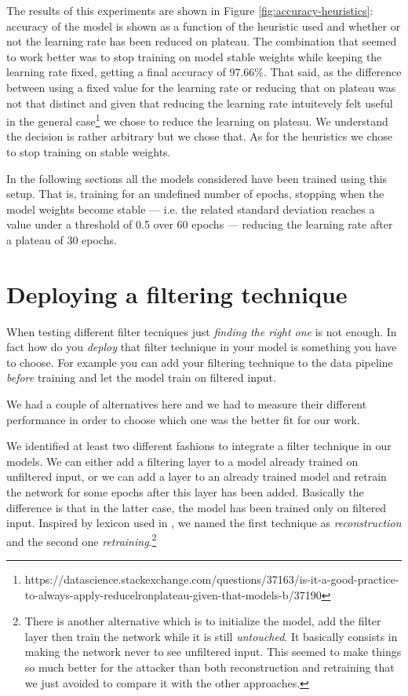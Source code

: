 The results of this experiments are shown in Figure
\ref{fig:accuracy-heuristics}: accuracy of the model is shown as a
function of the heuristic used and whether or not the learning rate has
been reduced on plateau. The combination that seemed to work better was
to stop training on model stable weights while keeping the learning
rate fixed, getting a final accuracy of 97.66\%. That said, as the
difference between using a fixed value for the learning rate or
reducing that on plateau was not that distinct and given that reducing
the learning rate intuitevely felt useful in the general
case\footnote{https://datascience.stackexchange.com/questions/37163/is-it-a-good-practice-to-always-apply-reducelronplateau-given-that-models-b/37190}
we chose to reduce the learning on plateau. We understand the decision
is rather arbitrary but we chose that. As for the heuristics we chose
to stop training on stable weights.

In the following sections all the models considered have been trained
using this setup. That is, training for an undefined number of
epochs, stopping when the model weights become stable --- i.e. the
related standard deviation reaches a value under a threshold of 0.5 over
60 epochs --- reducing the learning rate after a plateau of 30 epochs.

\section{Deploying a filtering technique}
\label{sec:deploying-a-filtering-technique}

When testing different filter tecniques just \emph{finding the right
  one} is not enough. In fact how do you \emph{deploy} that filter
technique in your model is something you have to choose. For example
you can add your filtering technique to the data pipeline \emph{before}
training and let the model train on filtered input.

We had a couple of alternatives here and we had to measure their
different performance in order to choose which one was the better fit
for our work.

We identified at least two different fashions to integrate a filter
technique in our models. We can either add a filtering layer to a model
already trained on unfiltered input, or we can add a layer to an
already trained model and retrain the network for some epochs after
this layer has been added. Basically the difference is that in the latter case, the model has
been trained only on filtered input.
Inspired by lexicon used in \cite{bhagoji2018enhancing}, we named the
first technique as \emph{reconstruction} and the second one
\emph{retraining}.\footnote{There is another alternative which is to
  initialize the model, add the filter layer then train the network
  while it is still \emph{untouched}. It basically consists in making
  the network never to see unfiltered input. This seemed to make things
  so much better for the attacker than both reconstruction and
  retraining that we just avoided to compare it with the other
  approaches.}


